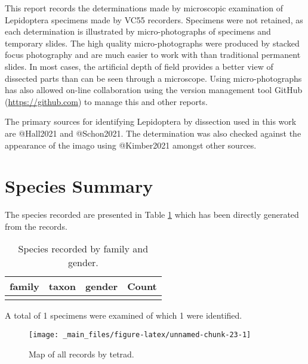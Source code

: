\documentclass[
]{article}
\begin{document}
This report records the determinations made by microscopic examination of Lepidoptera specimens made by VC55 recorders. Specimens were not retained, as each determination is illustrated by micro-photographs of specimens and temporary slides. The high quality micro-photographs were produced by stacked focus photography and are much easier to work with than traditional permanent slides. In most cases, the artificial depth of field provides a better view of dissected parts than can be seen through a microscope. Using micro-photographs has also allowed on-line collaboration using the version management tool GitHub (\url{https://github.com}) to manage this and other reports.

The primary sources for identifying Lepidoptera by dissection used in this work are @Hall2021 and @Schon2021. The determination was also checked against the appearance of the imago using @Kimber2021 amongst other sources.

\hypertarget{species-summary}{%
\section{Species Summary}\label{species-summary}}

The species recorded are presented in Table \ref{tab:TableSpeciesList} which has been directly generated from the records.

\begin{table}

\caption{\label{tab:TableSpeciesList}Species recorded by family and gender.}
\centering
\begin{tabular}[t]{lllr}
\toprule
family & taxon & gender & Count\\
\midrule
\cellcolor{gray!6}{Dummida} & \cellcolor{gray!6}{Funny} & \cellcolor{gray!6}{Male, Female} & \cellcolor{gray!6}{1}\\
\bottomrule
\end{tabular}
\end{table}

A total of 1 specimens were examined of which 1 were identified.

\begin{figure}[p]

{\centering \texttt{[image: \_main\_files/figure-latex/unnamed-chunk-23-1]} 

}

\caption{Map of all records by tetrad.}\label{fig:unnamed-chunk-23}
\end{figure}
\end{document}
